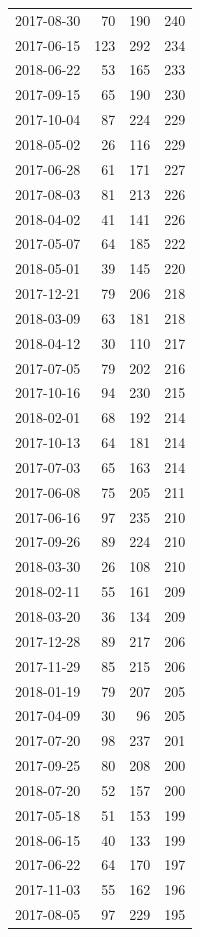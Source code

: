 \begin{tabular}{lrrr}
2017-08-30 & 70 & 190 & 240 \\
2017-06-15 & 123 & 292 & 234 \\
2018-06-22 & 53 & 165 & 233 \\
2017-09-15 & 65 & 190 & 230 \\
2017-10-04 & 87 & 224 & 229 \\
2018-05-02 & 26 & 116 & 229 \\
2017-06-28 & 61 & 171 & 227 \\
2017-08-03 & 81 & 213 & 226 \\
2018-04-02 & 41 & 141 & 226 \\
2017-05-07 & 64 & 185 & 222 \\
2018-05-01 & 39 & 145 & 220 \\
2017-12-21 & 79 & 206 & 218 \\
2018-03-09 & 63 & 181 & 218 \\
2018-04-12 & 30 & 110 & 217 \\
2017-07-05 & 79 & 202 & 216 \\
2017-10-16 & 94 & 230 & 215 \\
2018-02-01 & 68 & 192 & 214 \\
2017-10-13 & 64 & 181 & 214 \\
2017-07-03 & 65 & 163 & 214 \\
2017-06-08 & 75 & 205 & 211 \\
2017-06-16 & 97 & 235 & 210 \\
2017-09-26 & 89 & 224 & 210 \\
2018-03-30 & 26 & 108 & 210 \\
2018-02-11 & 55 & 161 & 209 \\
2018-03-20 & 36 & 134 & 209 \\
2017-12-28 & 89 & 217 & 206 \\
2017-11-29 & 85 & 215 & 206 \\
2018-01-19 & 79 & 207 & 205 \\
2017-04-09 & 30 & 96 & 205 \\
2017-07-20 & 98 & 237 & 201 \\
2017-09-25 & 80 & 208 & 200 \\
2018-07-20 & 52 & 157 & 200 \\
2017-05-18 & 51 & 153 & 199 \\
2018-06-15 & 40 & 133 & 199 \\
2017-06-22 & 64 & 170 & 197 \\
2017-11-03 & 55 & 162 & 196 \\
2017-08-05 & 97 & 229 & 195 \\

\end{tabular}
